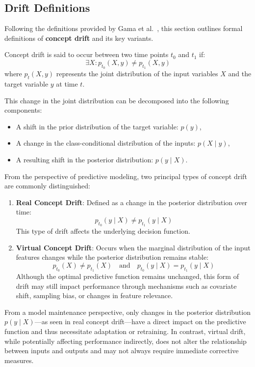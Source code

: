\subsection*{Drift Definitions}\label{subsec:drift_definitions}
Following the definitions provided by Gama et
al.~\cite{drift_adaptation_survey}, this section outlines formal definitions of
\textbf{concept drift} and its key variants.

Concept drift is said to occur between two time points $t_0$ and $t_1$ if:
\begin{equation}
    \exists X : p_{t_0}(X, y) \neq p_{t_1}(X, y)
\end{equation}
where $p_t(X, y)$ represents the joint distribution of the input variables $X$
and the target variable $y$ at time $t$.

This change in the joint distribution can be decomposed into the following
components:
\begin{itemize}
    \item A shift in the prior distribution of the target variable: $p(y)$,
    \item A change in the class-conditional distribution of the inputs: $p(X \mid y)$,
    \item A resulting shift in the posterior distribution: $p(y \mid X)$.
\end{itemize}

From the perspective of predictive modeling, two principal types of concept
drift are commonly distinguished:

\begin{enumerate}
    \item \textbf{Real Concept Drift}: Defined as a change in the posterior
          distribution over time:
          \begin{equation}
              p_{t_0}(y \mid X) \neq p_{t_1}(y \mid X)
          \end{equation}
          This type of drift affects the underlying decision function.

    \item \textbf{Virtual Concept Drift}: Occurs when the marginal distribution
          of the input features changes while the posterior distribution remains stable:
          \begin{equation}
              p_{t_0}(X) \neq p_{t_1}(X) \quad \text{and} \quad p_{t_0}(y \mid X) =
              p_{t_1}(y \mid X)
          \end{equation}
          Although the optimal predictive function remains unchanged, this form
          of drift may still impact performance through mechanisms such as covariate
          shift, sampling bias, or changes in feature relevance.
\end{enumerate}
From a model maintenance perspective, only changes in the posterior distribution $p(y \mid X)$—as
seen in real concept drift—have a direct impact on the predictive function and thus
necessitate adaptation or retraining. In contrast, virtual drift, while potentially
affecting performance indirectly, does not alter the relationship between inputs and
outputs and may not always require immediate corrective measures.

